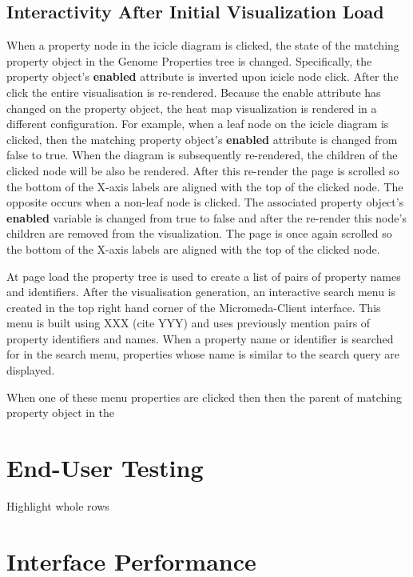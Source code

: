 \subsection{Interactivity After Initial Visualization Load}

When a property node in the icicle diagram is clicked, the state of the matching property object in the Genome Properties tree is changed. Specifically, the property object's \textbf{enabled} attribute is inverted upon icicle node click. After the click the entire visualisation is  re-rendered. Because the enable attribute has changed on the property object, the heat map visualization is rendered in a different configuration. For example, when a leaf node on the icicle diagram is clicked, then the matching property object's \textbf{enabled} attribute is changed from false to true. When the diagram is subsequently re-rendered, the children of the clicked node will be also be rendered. After this re-render the page is scrolled so the bottom of the X-axis labels are aligned with the top of the clicked node. The opposite occurs when a non-leaf node is clicked. The associated property object's \textbf{enabled} variable is changed from true to false and after the re-render this node's children are removed from the visualization. The page is once again scrolled so the bottom of the X-axis labels are aligned with the top of the clicked node.

At page load the property tree is used to create a list of pairs of property names and identifiers. After the visualisation generation, an interactive search menu is created in the top right hand corner of the Micromeda-Client interface. This menu is built using XXX (cite YYY) and uses previously mention pairs of property identifiers and names. When a property name or identifier is searched for in the search menu, properties whose name is similar to the search query are displayed.

When one of these menu properties are clicked then then the parent of matching property object in the 

\section{End-User Testing}

Highlight whole rows

\section{Interface Performance}

